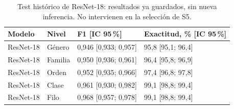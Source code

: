 \begin{table}[H]
\centering
\footnotesize
\caption{Test histórico de ResNet-18: resultados ya guardados, sin nueva inferencia. No intervienen en la selección de S5.}
\label{tab:tax-test}
\begin{tabularx}{\linewidth}{l l Y Y}
\toprule
\textbf{Modelo} & \textbf{Nivel} & \textbf{F1 [IC 95\,\%]} & \textbf{Exactitud, \% [IC 95\,\%]}\\
\midrule
ResNet-18 & Género & 0,946 [0,933; 0,957] & 95,8 [95,1; 96,4]\\
ResNet-18 & Familia & 0,950 [0,936; 0,961] & 96,4 [95,8; 96,9]\\
ResNet-18 & Orden & 0,952 [0,935; 0,966] & 97,4 [96,8; 97,8]\\
ResNet-18 & Clase & 0,961 [0,930; 0,982] & 99,1 [98,8; 99,4]\\
ResNet-18 & Filo & 0,968 [0,957; 0,978] & 99,1 [98,8; 99,4]\\
\bottomrule
\end{tabularx}
\end{table}
